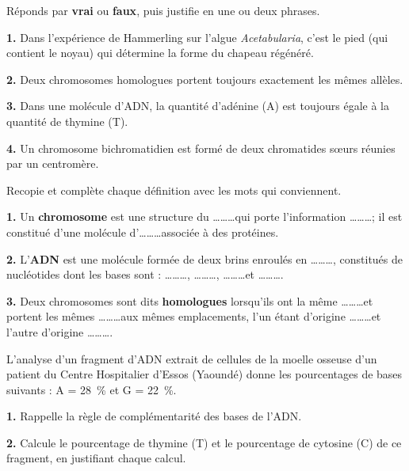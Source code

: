 \documentclass[11pt]{article}
\begin{document}
\begin{exercice}
Réponds par \textbf{vrai} ou \textbf{faux}, puis justifie en une ou deux phrases.

\textbf{1.} Dans l'expérience de Hammerling sur l'algue \emph{Acetabularia}, c'est le pied (qui contient le noyau) qui détermine la forme du chapeau régénéré.

\textbf{2.} Deux chromosomes homologues portent toujours exactement les mêmes allèles.

\textbf{3.} Dans une molécule d'ADN, la quantité d'adénine (A) est toujours égale à la quantité de thymine (T).

\textbf{4.} Un chromosome bichromatidien est formé de deux chromatides sœurs réunies par un centromère.
\end{exercice}

\begin{exercice}
Recopie et complète chaque définition avec les mots qui conviennent.

\textbf{1.} Un \textbf{chromosome} est une structure du \dots\ldots\ldots qui porte l'information \dots\ldots\ldots ; il est constitué d'une molécule d'\dots\ldots\ldots associée à des protéines.

\textbf{2.} L'\textbf{ADN} est une molécule formée de deux brins enroulés en \dots\ldots\ldots, constitués de nucléotides dont les bases sont : \dots\ldots\ldots, \dots\ldots\ldots, \dots\ldots\ldots et \dots\ldots\ldots.

\textbf{3.} Deux chromosomes sont dits \textbf{homologues} lorsqu'ils ont la même \dots\ldots\ldots et portent les mêmes \dots\ldots\ldots aux mêmes emplacements, l'un étant d'origine \dots\ldots\ldots et l'autre d'origine \dots\ldots\ldots.
\end{exercice}

\begin{exercice}
L'analyse d'un fragment d'ADN extrait de cellules de la moelle osseuse d'un patient du Centre Hospitalier d'Essos (Yaoundé) donne les pourcentages de bases suivants : A = \SI{28}{\%} et G = \SI{22}{\%}.

\textbf{1.} Rappelle la règle de complémentarité des bases de l'ADN.

\textbf{2.} Calcule le pourcentage de thymine (T) et le pourcentage de cytosine (C) de ce fragment, en justifiant chaque calcul.
\end{exercice}
\end{document}
